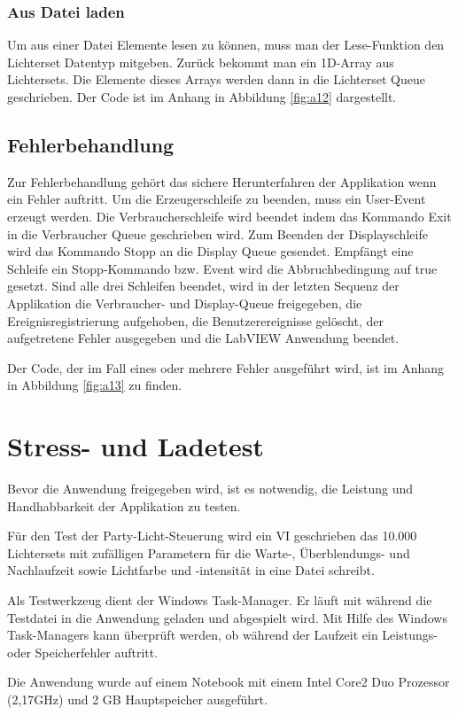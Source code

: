 \subsubsection{Aus Datei laden}
Um aus einer Datei Elemente lesen zu können, muss man der Lese-Funktion den Lichterset Datentyp mitgeben. 
Zurück bekommt man ein 1D-Array aus Lichtersets. Die Elemente dieses Arrays werden dann in die Lichterset Queue geschrieben. 
Der Code ist im Anhang in Abbildung \ref{fig:a12} dargestellt.


\subsection{Fehlerbehandlung}
\label{chap:fehler}
Zur Fehlerbehandlung gehört das sichere Herunterfahren der Applikation wenn ein Fehler auftritt. Um die Erzeugerschleife zu beenden,
muss ein User-Event erzeugt werden. Die Verbraucherschleife wird beendet indem das Kommando Exit in die Verbraucher Queue geschrieben wird. 
Zum Beenden der Displayschleife wird das Kommando Stopp an die Display Queue gesendet. 
Empfängt eine Schleife  ein Stopp-Kommando bzw. Event wird die Abbruchbedingung auf true gesetzt. 
Sind alle drei Schleifen beendet, wird in der letzten Sequenz der Applikation die Verbraucher- und Display-Queue freigegeben, 
die Ereignisregistrierung aufgehoben, die Benutzerereignisse gelöscht, der aufgetretene Fehler ausgegeben und die LabVIEW Anwendung beendet.

Der Code, der im Fall eines oder mehrere Fehler ausgeführt wird, ist im Anhang in Abbildung \ref{fig:a13} zu finden.


\section{Stress- und Ladetest}		
Bevor die Anwendung freigegeben wird, ist es notwendig, die Leistung und Handhabbarkeit der Applikation zu testen. 

Für den Test der Party-Licht-Steuerung wird ein VI geschrieben das 10.000 Lichtersets mit zufälligen Parametern für die Warte-, Überblendungs- und Nachlaufzeit sowie Lichtfarbe und -intensität
in eine Datei schreibt. 

Als Testwerkzeug dient der Windows Task-Manager. Er läuft mit während die Testdatei in die Anwendung geladen und abgespielt wird.
Mit Hilfe des Windows Task-Managers kann überprüft werden, ob während der Laufzeit ein Leistungs- oder Speicherfehler auftritt. 

Die Anwendung wurde auf einem Notebook mit einem Intel Core2 Duo Prozessor (2,17GHz) und 2 GB Hauptspeicher ausgeführt. 

